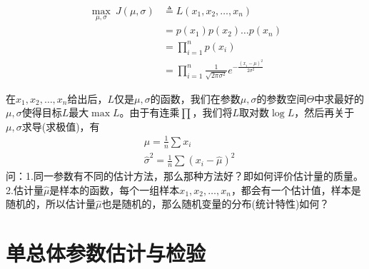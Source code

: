     \begin{align*}
    \max_{\mu,\sigma} \ J(\mu,\sigma)&\triangleq L(x_1,x_2,\dots,x_n) \\
    &= p(x_1)p(x_2)\dots p(x_n)\\
    &= \prod_{i = 1}^np(x_i)\\
    &= \prod_{i = 1}^n \frac{1}{\sqrt{2\pi\sigma^2}} e^{-\frac{(x_i-\mu)^2}{2\sigma^2}}
    \end{align*}
    \par
    在$x_1,x_2,\dots,x_n$给出后，$L$仅是$\mu,\sigma$的函数，我们在参数$\mu,\sigma$的参数空间$\Theta$中求最好的$\mu,\sigma$使得目标$L$最大$\max L$。由于有连乘$\prod$，我们将$L$取对数$\log L$，然后再关于$\mu,\sigma$求导(求极值)，有
    \begin{align*}
    &\hat{\mu} = \frac{1}{n}\sum x_i\\
    &\hat{\sigma}^2 = \frac{1}{n}\sum (x_i - \hat{\mu})^2
    \end{align*}
    问：1.同一参数有不同的估计方法，那么那种方法好？即如何评价估计量的质量。2.估计量$\hat{\mu}$是样本的函数，每个一组样本$x_1,x_2,\dots,x_n$，都会有一个估计值，样本是随机的，所以估计量$\hat{\mu}$也是随机的，那么随机变量的分布(统计特性)如何？
\section{单总体参数估计与检验}
